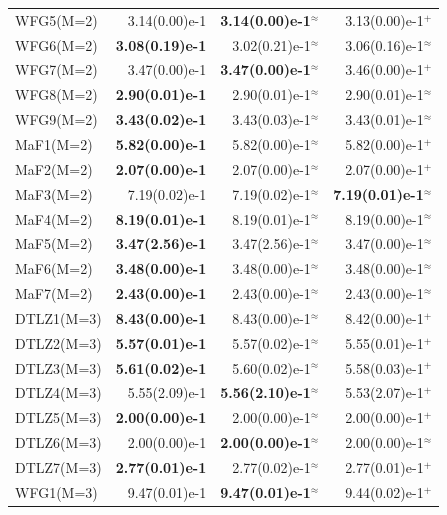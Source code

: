 \begin{table}[t]
\begin{tabular}{lrrr}
WFG5(M=2) & 3.14(0.00)e-1 & \textbf{3.14(0.00)e-1$^{\approx}$} & 3.13(0.00)e-1$^{+}$ \\
WFG6(M=2) & \textbf{3.08(0.19)e-1} & 3.02(0.21)e-1$^{\approx}$ & 3.06(0.16)e-1$^{\approx}$ \\
WFG7(M=2) & 3.47(0.00)e-1 & \textbf{3.47(0.00)e-1$^{\approx}$} & 3.46(0.00)e-1$^{+}$ \\
WFG8(M=2) & \textbf{2.90(0.01)e-1} & 2.90(0.01)e-1$^{\approx}$ & 2.90(0.01)e-1$^{\approx}$ \\
WFG9(M=2) & \textbf{3.43(0.02)e-1} & 3.43(0.03)e-1$^{\approx}$ & 3.43(0.01)e-1$^{\approx}$ \\
MaF1(M=2) & \textbf{5.82(0.00)e-1} & 5.82(0.00)e-1$^{\approx}$ & 5.82(0.00)e-1$^{+}$ \\
MaF2(M=2) & \textbf{2.07(0.00)e-1} & 2.07(0.00)e-1$^{\approx}$ & 2.07(0.00)e-1$^{+}$ \\
MaF3(M=2) & 7.19(0.02)e-1 & 7.19(0.02)e-1$^{\approx}$ & \textbf{7.19(0.01)e-1$^{\approx}$} \\
MaF4(M=2) & \textbf{8.19(0.01)e-1} & 8.19(0.01)e-1$^{\approx}$ & 8.19(0.00)e-1$^{\approx}$ \\
MaF5(M=2) & \textbf{3.47(2.56)e-1} & 3.47(2.56)e-1$^{\approx}$ & 3.47(0.00)e-1$^{\approx}$ \\
MaF6(M=2) & \textbf{3.48(0.00)e-1} & 3.48(0.00)e-1$^{\approx}$ & 3.48(0.00)e-1$^{\approx}$ \\
MaF7(M=2) & \textbf{2.43(0.00)e-1} & 2.43(0.00)e-1$^{\approx}$ & 2.43(0.00)e-1$^{\approx}$ \\
DTLZ1(M=3) & \textbf{8.43(0.00)e-1} & 8.43(0.00)e-1$^{\approx}$ & 8.42(0.00)e-1$^{+}$ \\
DTLZ2(M=3) & \textbf{5.57(0.01)e-1} & 5.57(0.02)e-1$^{\approx}$ & 5.55(0.01)e-1$^{+}$ \\
DTLZ3(M=3) & \textbf{5.61(0.02)e-1} & 5.60(0.02)e-1$^{\approx}$ & 5.58(0.03)e-1$^{+}$ \\
DTLZ4(M=3) & 5.55(2.09)e-1 & \textbf{5.56(2.10)e-1$^{\approx}$} & 5.53(2.07)e-1$^{+}$ \\
DTLZ5(M=3) & \textbf{2.00(0.00)e-1} & 2.00(0.00)e-1$^{\approx}$ & 2.00(0.00)e-1$^{+}$ \\
DTLZ6(M=3) & 2.00(0.00)e-1 & \textbf{2.00(0.00)e-1$^{\approx}$} & 2.00(0.00)e-1$^{\approx}$ \\
DTLZ7(M=3) & \textbf{2.77(0.01)e-1} & 2.77(0.02)e-1$^{\approx}$ & 2.77(0.01)e-1$^{+}$ \\
WFG1(M=3) & 9.47(0.01)e-1 & \textbf{9.47(0.01)e-1$^{\approx}$} & 9.44(0.02)e-1$^{+}$ \\

\end{tabular}
\end{table}
